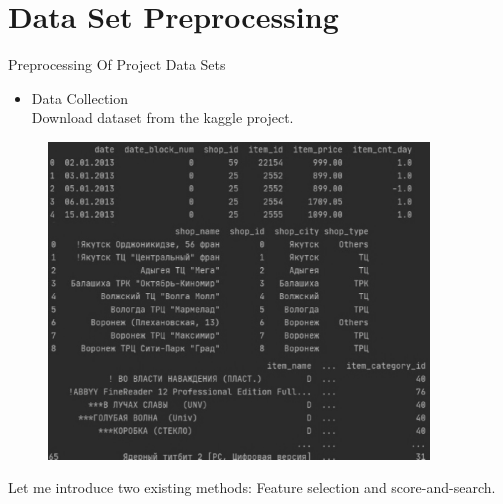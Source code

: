 \documentclass[
 size=14pt,
 paper=smartboard,  %
 mode=present, 		%
 display=slides, 	%
 style=tuliplab,  	%
 pauseslide,
 fleqn,leqno]{powerdot}
\begin{document}


\section{Data Set Preprocessing}


\begin{slide}{Preprocessing Of Project Data Sets}
\begin{itemize}
  \item Data Collection 
  \\Download dataset from the kaggle project.
  \end{itemize}
  \begin{figure}[htbp]
    \centering
    \begin{minipage}[t]{0.48\textwidth}
      \centering
      \includegraphics[width=0.9\textwidth]{logos/data1.eps}
      \vspace{0.4em}
    \end{minipage}
  \end{figure}
\bigskip





\begin{note}
Let me introduce two existing methods:
Feature selection and score-and-search.


\end{note}
\end{slide}
\end{document}
